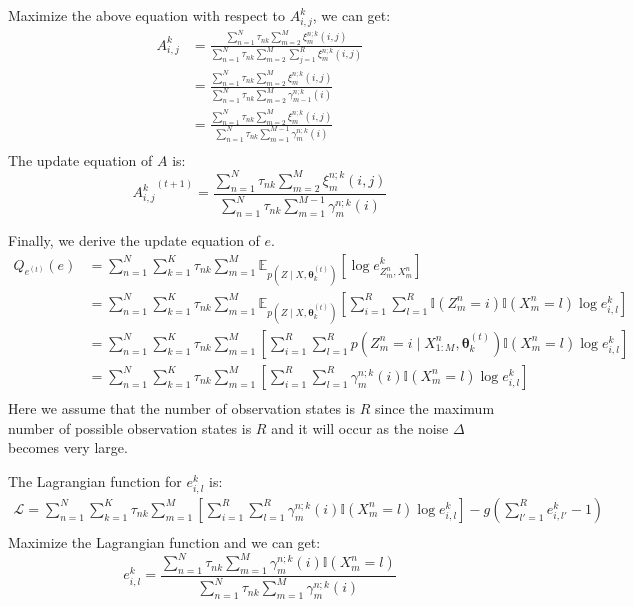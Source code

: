 \documentclass[12pt]{article}
\newenvironment{problem}[2][Problem]{\begin{trivlist}
\item[\hskip \labelsep {\bfseries #1}\hskip \labelsep {\bfseries #2.}]}{\end{trivlist}}
\begin{document}
\begin{problem}{2.7.21}
Maximize the above equation with respect to $A^k_{i,j}$, we can get:
\begin{align*}
    A^k_{i,j}&= \frac{\sum_{n=1}^{N} \tau_{nk} \sum_{m=2}^{M} \xi_{m}^{n;k}(i,j)}
                     {\sum_{n=1}^{N} \tau_{nk} \sum_{m=2}^{M} \sum_{j=1}^{R} \xi_{m}^{n;k}(i,j)} \\
             &= \frac{\sum_{n=1}^{N} \tau_{nk} \sum_{m=2}^{M} \xi_{m}^{n;k}(i,j)}
                     {\sum_{n=1}^{N} \tau_{nk} \sum_{m=2}^{M} \gamma_{m-1}^{n;k}(i)} \\
             &= \frac{\sum_{n=1}^{N} \tau_{nk} \sum_{m=2}^{M} \xi_{m}^{n;k}(i,j)}
                     {\sum_{n=1}^{N} \tau_{nk} \sum_{m=1}^{M-1} \gamma_{m}^{n;k}(i)} \\
\end{align*}
The update equation of $A$ is:
\begin{equation}
    {A^k_{i,j}}^{(t+1)} = 
        \frac{\sum_{n=1}^{N} \tau_{nk} \sum_{m=2}^{M} \xi_{m}^{n;k}(i,j)}
             {\sum_{n=1}^{N} \tau_{nk} \sum_{m=1}^{M-1} \gamma_{m}^{n;k}(i)}
\end{equation}

Finally, we derive the update equation of $e$.
\begin{align*}
    Q_{e^{(t)}}(e) &= \sum_{n=1}^{N} \sum_{k=1}^{K} \tau_{nk} \sum_{m=1}^{M} 
        \mathbb{E}_{p(Z\mid X, \bm{\theta}^{(t)}_k)}[\log e^k_{Z^n_{m},X^n_m}] \\
    &= \sum_{n=1}^{N} \sum_{k=1}^{K} \tau_{nk} \sum_{m=1}^{M} 
        \mathbb{E}_{p(Z\mid X, \bm{\theta}^{(t)}_k)}
            [\sum_{i=1}^{R}\sum_{l=1}^{R}
            \mathbb{I}(Z^n_{m} = i)\mathbb{I}(X^n_{m} = l)\log e^k_{i,l}] \\
    &= \sum_{n=1}^{N} \sum_{k=1}^{K} \tau_{nk} \sum_{m=1}^{M} 
        [\sum_{i=1}^{R}\sum_{l=1}^{R} p(Z^n_{m} = i\mid X^{n}_{1:M}, \bm{\theta}^{(t)}_k)
        \mathbb{I}(X^n_{m} = l)\log e^k_{i,l}] \\
    &= \sum_{n=1}^{N} \sum_{k=1}^{K} \tau_{nk} \sum_{m=1}^{M} 
        [\sum_{i=1}^{R}\sum_{l=1}^{R} \gamma_{m}^{n;k}(i)
        \mathbb{I}(X^n_{m} = l)\log e^k_{i,l}] \\
\end{align*}
Here we assume that the number of observation states is $R$ since 
the maximum number of possible observation states is $R$ and it will occur as 
the noise $\Delta$ becomes very large.

The Lagrangian function for $e^k_{i,l}$ is:
\begin{align*}
    \mathcal{L} = 
        \sum_{n=1}^{N} \sum_{k=1}^{K} \tau_{nk} \sum_{m=1}^{M} 
            [\sum_{i=1}^{R}\sum_{l=1}^{R} \gamma_{m}^{n;k}(i)
            \mathbb{I}(X^n_{m} = l)\log e^k_{i,l}] 
        - g(\sum_{l'=1}^{R}e^k_{i,l'} - 1)\\
\end{align*}
Maximize the Lagrangian function and we can get:
\begin{equation}
    e^k_{i,l} = 
    \frac{\sum_{n=1}^{N}\tau_{nk} \sum_{m=1}^{M} \gamma_{m}^{n;k}(i)\mathbb{I}(X^n_{m} = l)}
        {\sum_{n=1}^{N}\tau_{nk} \sum_{m=1}^{M} \gamma_{m}^{n;k}(i)}
\end{equation}


\end{problem}
\end{document}
